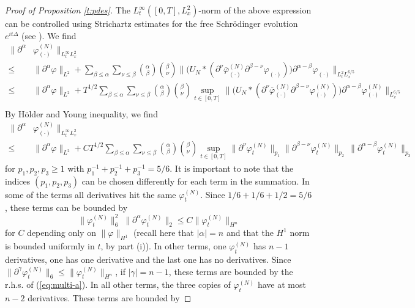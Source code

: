 \documentclass[11pt,a4paper,DIV11]{scrartcl}	%
\begin{document}
\begin{proof}[Proof of Proposition \ref{t:pdes}]
The $L_t^\infty ([0,T] , L_x^2)$-norm of the above expression can be controlled using
Strichartz estimates for the free Schr\"odinger evolution $e^{it\Delta}$
(see \cite[Theorem 1.2]{KT}). We find
\[\begin{split}
\| \partial^\alpha & \varphi^{(N)}_{(\cdot)} \|_{L_t^\infty L_x^2}  \\ \leq \; & \|
    \partial^\alpha \varphi \|_{L^2} +  \sum_{\beta \le \alpha} \sum_{\nu \le \beta} \binom{\alpha}{\beta}
    \binom{\beta}{\nu} \| \big( U_N * (\partial^\nu
    \overline{\varphi}^{(N)}_{(\cdot)} \partial^{\beta - \nu} \varphi_{(\cdot)})
    \big) \partial^{\alpha - \beta} \varphi_{(\cdot)} \|_{L_t^2 L_x^{6/5}} \\
     \leq \; & \|
    \partial^\alpha \varphi \|_{L^2} +  T^{1/2} \sum_{\beta \le \alpha} \sum_{\nu \le \beta} \binom{\alpha}{\beta}
    \binom{\beta}{\nu}  \sup_{t \in [0,T]} \| \big( U_N * (\partial^\nu
    \overline{\varphi}^{(N)}_{(\cdot)} \partial^{\beta - \nu} \varphi^{(N)}_{(\cdot)})
    \big) \partial^{\alpha - \beta} \varphi^{(N)}_{(\cdot)} \|_{L_x^{6/5}} \\
\end{split} \]    
By H\"older and Young inequality, we find 
\[ \begin{split}
\| \partial^\alpha & \varphi^{(N)}_{(\cdot)} \|_{L_t^\infty L_x^2} \\ \leq \; & \|
    \partial^\alpha \varphi \|_{L^2} + C T^{1/2}  \sum_{\beta \le \alpha} \sum_{\nu \le \beta}
    \binom{\alpha}{\beta} \binom{\beta}{\nu} \sup_{t \in [0,T]} \|
    \partial^\nu \varphi_t^{(N)} \|_{p_1} \| \partial^{\beta - \nu} \varphi_t^{(N)}
    \|_{p_2} \, \| \partial^{\alpha - \beta} \varphi_t^{(N)}
    \|_{p_3} 
  \end{split}\]
for $p_1, p_2, p_3 \geq 1$ with $p_1^{-1} + p_2^{-1} + p_3^{-1} = 5/6$. It is important to note that the indices $(p_1, p_2, p_3)$ can be chosen differently for each term in the summation. In some of the terms all derivatives hit the same $\varphi_t^{(N)}$. Since $1/6 + 1/6 + 1/2 = 5/6$, these terms can be bounded by
\begin{equation}\label{eq:multi-a}  \| \varphi_t^{(N)} \|^2_{6} \; \| \partial^\alpha \varphi_t^{(N)} \|_{2} \leq C \| \varphi_t^{(N)} \|_{H^n} \end{equation} for $C$ depending only on $\| \varphi \|_{H^1}$ (recall here that $|\alpha| = n$ and that the $H^1$ norm is bounded uniformly in $t$, by part (i)). In other terms, one $\varphi_t^{(N)}$ has $n - 1$ derivatives, one has one derivative and the last one has no derivatives. Since $\| \partial^{\gamma} \varphi_t^{(N)} \|_6 \leq \| \varphi_t^{(N)} \|_{H^n}$, if $|\gamma| = n-1$, these terms are bounded by the r.h.s. of (\ref{eq:multi-a}). In all other terms, the three copies of $\varphi_t^{(N)}$ have at most $n-2$ derivatives. These terms are bounded by 

\end{proof}
\end{document}
